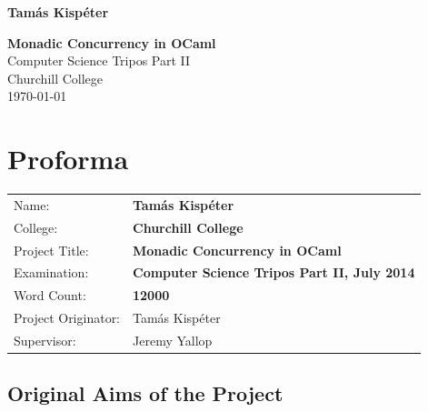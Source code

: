 \documentclass[12pt,twoside,notitlepage]{report}
\theoremstyle{plain}%
\theoremstyle{definition}
\theoremstyle{remark}
\begin{document}





\pagestyle{empty}

\hfill{\LARGE \bf Tam\'as Kisp\'eter}

\vspace*{60mm}
\begin{center}
\Huge
{\bf Monadic Concurrency in OCaml} \\
\vspace*{5mm}
Computer Science Tripos Part II \\
\vspace*{5mm}
Churchill College \\
\vspace*{5mm}
\today  %
\end{center}

\cleardoublepage


\setcounter{page}{1}
\pagestyle{plain}

\chapter*{Proforma}

{\large
\begin{tabular}{ll}
Name:               & \bf Tam\'as Kisp\'eter                     \\
College:            & \bf Churchill College                     \\
Project Title:      & \bf Monadic Concurrency in OCaml \\
Examination:        & \bf Computer Science Tripos Part II, July 2014        \\
Word Count:         & \bf 12000\footnotemark[1]            \\
Project Originator: & Tam\'as Kisp\'eter                    \\
Supervisor:         & Jeremy Yallop                    \\ 
\end{tabular}
}


\section*{Original Aims of the Project}
\end{document}
